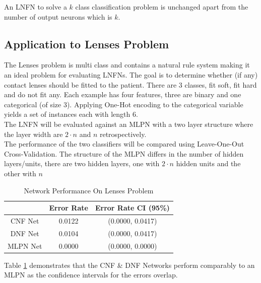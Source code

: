 \begin{definition}
	An LNFN to solve a $k$ class classification problem is unchanged apart from the number of output neurons which is $k$.
\end{definition}

\subsection{Application to Lenses Problem}
The Lenses problem \cite{Lichman:2013} is multi class and contains a natural rule system making it an ideal problem for evaluating LNFNs. The goal is to determine whether (if any) contact lenses should be fitted to the patient. There are 3 classes, fit soft, fit hard and do not fit any. Each example has four features, three are binary and one categorical (of size 3). Applying One-Hot encoding to the categorical variable yields a set of instances each with length 6.\\

The LNFN will be evaluated against an MLPN with a two layer structure where the layer width are $2 \cdot n$ and $n$ retrospectively.\\

The performance of the two classifiers will be compared using Leave-One-Out Cross-Validation. The structure of the MLPN differs in the number of hidden layers/units, there are two hidden layers, one with $2 \cdot n$ hidden units and the other with $n$

\begin{table}[H]
	\begin{center}
		\begin{tabular}{| c | c | c |}
			\hline
			& Error Rate & Error Rate CI (95\%) \\
			\hline
			\hline
			CNF Net & 0.0122 & (0.0000, 0.0417) \\
			\hline
			DNF Net & 0.0104 & (0.0000, 0.0417) \\
			\hline
			MLPN Net & 0.0000 & (0.0000, 0.0000) \\
			\hline
		\end{tabular}
	\end{center}
	\caption{Network Performance On Lenses Problem}
	\label{tab:lenses-peformance-comp}
\end{table}

Table \ref{tab:lenses-peformance-comp} demonstrates that the CNF \& DNF Networks perform comparably to an MLPN as the confidence intervals for the errors overlap.\\ 

